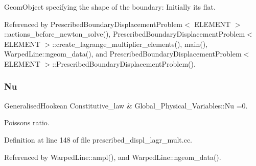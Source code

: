 Geom\+Object specifying the shape of the boundary\+: Initially it\textquotesingle{}s flat. 



Referenced by Prescribed\+Boundary\+Displacement\+Problem$<$ E\+L\+E\+M\+E\+N\+T $>$\+::actions\+\_\+before\+\_\+newton\+\_\+solve(), Prescribed\+Boundary\+Displacement\+Problem$<$ E\+L\+E\+M\+E\+N\+T $>$\+::create\+\_\+lagrange\+\_\+multiplier\+\_\+elements(), main(), Warped\+Line\+::ngeom\+\_\+data(), and Prescribed\+Boundary\+Displacement\+Problem$<$ E\+L\+E\+M\+E\+N\+T $>$\+::\+Prescribed\+Boundary\+Displacement\+Problem().

\mbox{\label{namespaceGlobal__Physical__Variables_a9e06f4ada334a9a911aa8cdcfb3ff30b}} 
\subsubsection{\texorpdfstring{Nu}{Nu}}
{\footnotesize\ttfamily Generalised\+Hookean Constitutive\+\_\+law \& Global\+\_\+\+Physical\+\_\+\+Variables\+::\+Nu =0.}



Poisson\textquotesingle{}s ratio. 



Definition at line 148 of file prescribed\+\_\+displ\+\_\+lagr\+\_\+mult.\+cc.



Referenced by Warped\+Line\+::ampl(), and Warped\+Line\+::ngeom\+\_\+data().

